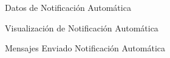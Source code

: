 \begin{figure}[htbp!]
	\centering
	\caption{Datos de Notificación Automática}
	\label{fig:GxAPI}
\end{figure}

\begin{figure}[htbp!]
	\centering
	\caption{Visualización de Notificación Automática}
	\label{fig:GxVisualiza}
\end{figure}

\begin{figure}[htbp!]
	\centering
	\caption{Mensajes Enviado Notificación Automática}
	\label{fig:GxMSN}
\end{figure}



